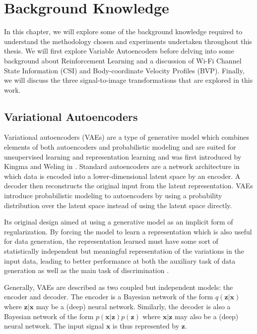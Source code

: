 \chapter{Background Knowledge}\label{chapter:background-knowledge}

In this chapter, we will explore some of the background knowledge required to understand the methodology chosen and experiments undertaken throughout this thesis.
We will first explore Variable Autoencoders before delving into some background about Reinforcement Learning and a discussion of Wi-Fi Channel State Information (CSI) and Body-coordinate Velocity Profiles (BVP).
Finally, we will discuss the three signal-to-image transformations that are explored in this work.

\section{Variational Autoencoders}

Variational autoencoders (VAEs) are a type of generative model which combines elements of both autoencoders and probabilistic modeling and are suited for unsupervised learning and representation learning and was first introduced by Kingma and Weling in \cite{kingma2013auto}.
Standard autoencoders are a network architecture in which data is encoded into a lower-dimensional latent space by an encoder.
A decoder then reconstructs the original input from the latent representation.
VAEs introduce probabilistic modeling to autoencoders by using a probability distribution over the latent space instead of using the latent space directly.

Its original design aimed at using a generative model as an implicit form of regularization.
By forcing the model to learn a representation which is also useful for data generation, the representation learned must have some sort of statistically independent but meaningful representation of the variations in the input data, leading to better performance at both the auxiliary task of data generation as well as the main task of discrimination \cite{kingma2019introduction}.

Generally, VAEs are described as two coupled but independent models: the encoder and decoder.
The encoder is a Bayesian network of the form $q(\boldsymbol{z} | \boldsymbol{x})$ where $\boldsymbol{z}|\boldsymbol{x}$ may be a (deep) neural network.
Similarly, the decoder is also a Bayesian network of the form $p(\boldsymbol{x}|\boldsymbol{z}) p(\boldsymbol{z})$ where $\boldsymbol{x}|\boldsymbol{z}$ may also be a (deep) neural network.
The input signal $\boldsymbol{x}$ is thus represented by $\boldsymbol{z}$.

